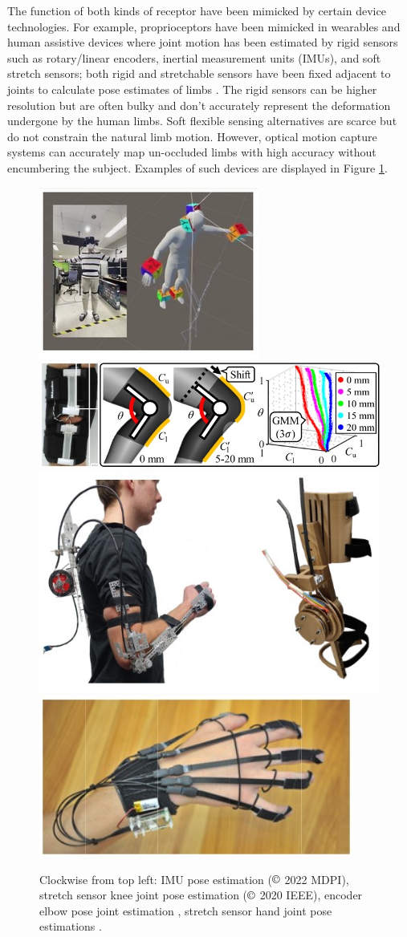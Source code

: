 The function of both kinds of receptor have been mimicked by certain device technologies. For example, proprioceptors have been mimicked in wearables and human assistive devices where joint motion has been estimated by rigid sensors such as rotary/linear encoders, inertial measurement units (IMUs), and soft stretch sensors; both rigid and stretchable sensors have been fixed adjacent to joints to calculate pose estimates of limbs \cite{OBrien2014,Eguchi2020,Chatfield2021,Kim2022}. The rigid sensors can be higher resolution but are often bulky and don't accurately represent the deformation undergone by the human limbs. Soft flexible sensing alternatives are scarce but do not constrain the natural limb motion. However, optical motion capture systems can accurately map un-occluded limbs with high accuracy without encumbering the subject. Examples of such devices are displayed in Figure \ref{fig:proprio-tech}. 
\begin{figure}[H]
    \centering
    \includegraphics[width=0.4\linewidth]{Figures/imu-pose-tracker-kim2022.jpg} %
    \includegraphics[width=0.4\linewidth]{Figures/knee-stretch-sense-eguchi2020.jpg} %
    \includegraphics[width=0.4\linewidth]{Figures/logan-assitive-arm-device.jpg}
    \includegraphics[width=0.4\linewidth]{Figures/stretch-sense-OBrien2014.jpg}
    \caption{Clockwise from top left: IMU pose estimation \cite{Kim2022} ($\copyright$ 2022 MDPI), stretch sensor knee joint pose estimation \cite{Eguchi2020} ($\copyright$ 2020 IEEE), encoder elbow pose joint estimation \cite{Chatfield2021}, stretch sensor hand joint pose estimations \cite{OBrien2014}.}
    \label{fig:proprio-tech}
\end{figure}

